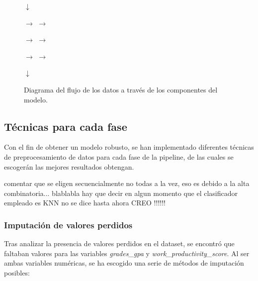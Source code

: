 \documentclass{article}
\begin{document}
\begin{figure}[H]
    \centering
    \ttfamily

    \vspace{0.2cm}$\downarrow$ \vspace{0.2cm}
    
     $\rightarrow$  $\rightarrow$
    
    \vspace{0.5cm}

     $\rightarrow$  $\rightarrow$
    
    \vspace{0.5cm}
    
     $\rightarrow$  $\rightarrow$

    \vspace{0.2cm}$\downarrow$ \vspace{0.2cm}

    
    \caption{Diagrama del flujo de los datos a través de los componentes del modelo.}
\end{figure}

\subsection{Técnicas para cada fase}

Con el fin de obtener un modelo robusto, se han implementado diferentes técnicas de preprocesamiento de datos para cada fase de la
pipeline, de las cuales se escogerán las mejores resultados obtengan. \newline

comentar que se eligen secuencialmente no todas a la vez, eso es debido a la alta combinatoria... blablabla hay que decir en algun momento que el clasificador empleado es KNN no se dice hasta ahora CREO !!!!!!

\subsubsection{Imputación de valores perdidos}

Tras analizar la presencia de valores perdidos en el dataset, se encontró que faltaban valores para las variables \textit{grades\_gpa} y
\textit{work\_productivity\_score}. Al ser ambas variables numéricas, se ha escogido una serie de métodos de imputación posibles:
\end{document}
